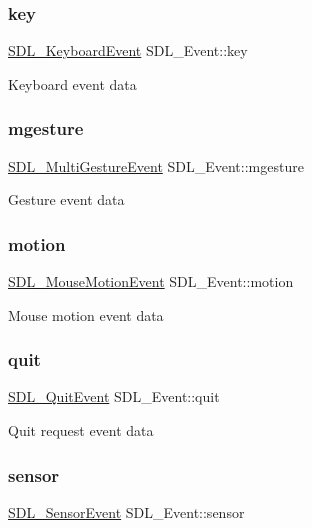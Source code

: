 \subsubsection{\texorpdfstring{key}{key}}
{\footnotesize\ttfamily \mbox{\hyperlink{struct_s_d_l___keyboard_event}{S\+D\+L\+\_\+\+Keyboard\+Event}} S\+D\+L\+\_\+\+Event\+::key}

Keyboard event data \mbox{\label{union_s_d_l___event_ac19b3c6a6b5181a51eb4fbe2cbe726a9}} 
\subsubsection{\texorpdfstring{mgesture}{mgesture}}
{\footnotesize\ttfamily \mbox{\hyperlink{struct_s_d_l___multi_gesture_event}{S\+D\+L\+\_\+\+Multi\+Gesture\+Event}} S\+D\+L\+\_\+\+Event\+::mgesture}

Gesture event data \mbox{\label{union_s_d_l___event_ac3c89e190faacbe84280cd539453bab6}} 
\subsubsection{\texorpdfstring{motion}{motion}}
{\footnotesize\ttfamily \mbox{\hyperlink{struct_s_d_l___mouse_motion_event}{S\+D\+L\+\_\+\+Mouse\+Motion\+Event}} S\+D\+L\+\_\+\+Event\+::motion}

Mouse motion event data \mbox{\label{union_s_d_l___event_a102a3008afe67a1c02ae7504e232dcef}} 
\subsubsection{\texorpdfstring{quit}{quit}}
{\footnotesize\ttfamily \mbox{\hyperlink{struct_s_d_l___quit_event}{S\+D\+L\+\_\+\+Quit\+Event}} S\+D\+L\+\_\+\+Event\+::quit}

Quit request event data \mbox{\label{union_s_d_l___event_af0da8e4a59228360984595125062eb2f}} 
\subsubsection{\texorpdfstring{sensor}{sensor}}
{\footnotesize\ttfamily \mbox{\hyperlink{struct_s_d_l___sensor_event}{S\+D\+L\+\_\+\+Sensor\+Event}} S\+D\+L\+\_\+\+Event\+::sensor}

